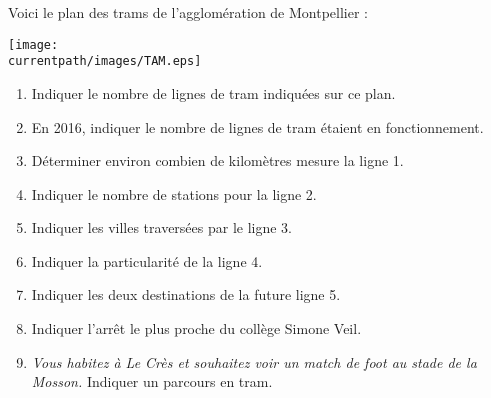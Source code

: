 \begin{exercice}
    Voici le plan des trams de l'agglomération de Montpellier : \\ [1mm]
    \begin{minipage}{11.5cm}
       \texttt{[image: \\currentpath/images/TAM.eps]}
    \end{minipage}
    \quad
    \begin{minipage}{5.5cm}
       \begin{enumerate}
          \item Indiquer le nombre de lignes de tram indiquées sur ce plan.
          \item En 2016, indiquer le nombre de lignes de tram étaient en fonctionnement.
          \item Déterminer environ combien de kilomètres mesure la ligne 1.
          \item Indiquer le nombre de stations pour la ligne 2.
          \item Indiquer les villes traversées par le ligne 3.
          \item Indiquer la particularité de la ligne 4.
          \item Indiquer les deux destinations de la future ligne 5.
          \item Indiquer l'arrêt le plus proche du collège Simone Veil.
          \item \textit{Vous habitez à Le Crès et souhaitez voir un match de foot au stade de la Mosson.}
          Indiquer un parcours en tram.
       \end{enumerate}       
    \end{minipage}
 \end{exercice}